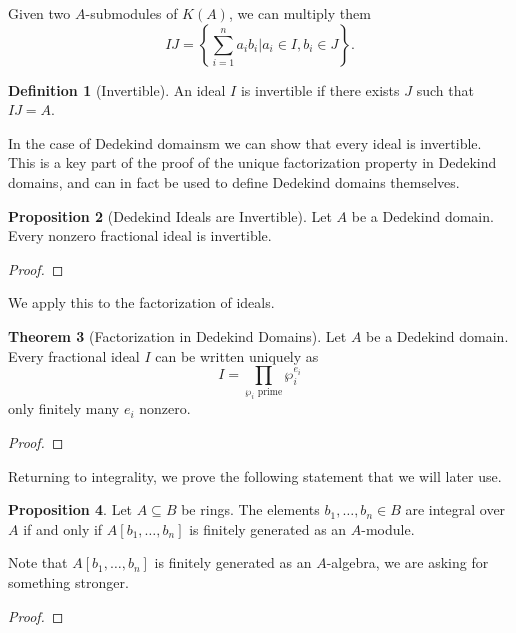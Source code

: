 \documentclass{amsart}
\theoremstyle{definition}
\newtheorem{theorem}{Theorem}[section]
\newtheorem{proposition}[theorem]{Proposition}
\newtheorem{definition}[theorem]{Definition}
\numberwithin{equation}{section}
\begin{document}
Given two $A$-submodules of $K(A)$, we can multiply them 
$$IJ=\left\{\sum_{i=1}^{n}a_{i}b_{i}|a_{i}\in I,b_{i}\in J\right\}.$$
\begin{definition}[Invertible]
  An ideal $I$ is invertible if there exists $J$ such that $IJ=A$. 
\end{definition}
In the case of Dedekind domainsm we can show that every ideal is invertible. This is a key part of the proof of the unique factorization property in Dedekind domains, and can in fact be used to define Dedekind domains themselves. 
\begin{proposition}[Dedekind Ideals are Invertible]
  Let $A$ be a Dedekind domain. Every nonzero fractional ideal is invertible. 
\end{proposition}
\begin{proof}
  
\end{proof}
We apply this to the factorization of ideals. 
\begin{theorem}[Factorization in Dedekind Domains]
  Let $A$ be a Dedekind domain. Every fractional ideal $I$ can be written uniquely as 
  $$I=\prod_{\wp_{i}\text{ prime}}\wp_{i}^{e_{i}}$$
  only finitely many $e_{i}$ nonzero. 
\end{theorem}
\begin{proof}
  
\end{proof}
Returning to integrality, we prove the following statement that we will later use. 
\begin{proposition}
  Let $A\subseteq B$ be rings. The elements $b_{1},\dots,b_{n}\in B$ are integral over $A$ if and only if $A[b_{1},\dots,b_{n}]$ is finitely generated as an $A$-module. 
\end{proposition}
Note that $A[b_{1},\dots,b_{n}]$ is finitely generated as an $A$-algebra, we are asking for something stronger. 
\begin{proof}
  
\end{proof}
\newpage
\printbibliography
\end{document}
